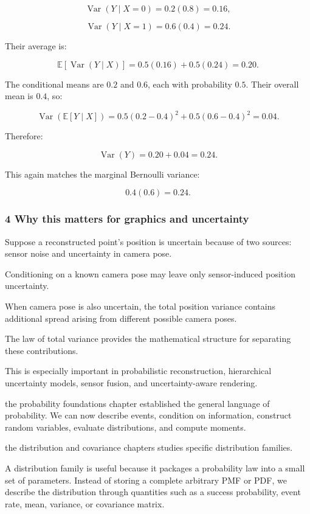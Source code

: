 \[
 \operatorname{Var}(Y\mid X=0)=0.2(0.8)=0.16,
\]

\[
 \operatorname{Var}(Y\mid X=1)=0.6(0.4)=0.24.
\]

Their average is:

\[
 \mathbb E[\operatorname{Var}(Y\mid X)] = 0.5(0.16)+0.5(0.24) =\boxed{0.20}.
\]

The conditional means are \(0.2\) and \(0.6\), each with probability \(0.5\). Their overall mean is \(0.4\), so:

\[
 \operatorname{Var}(\mathbb E[Y\mid X]) = 0.5(0.2-0.4)^2+ 0.5(0.6-0.4)^2 =\boxed{0.04}.
\]

Therefore:

\[
 \operatorname{Var}(Y)=0.20+0.04=\boxed{0.24}.
\]

This again matches the marginal Bernoulli variance:

\[
 0.4(0.6)=0.24.
\]

\subsubsection{4 Why this matters for graphics and uncertainty}\label{02-foundations-ii-ch023-why-this-matters-for-graphics-and-uncertainty}

\hypertarget{02-foundations-ii-ch023-why-this-matters-for-graphics-and-uncertainty}{}

Suppose a reconstructed point's position is uncertain because of two sources: sensor noise and uncertainty in camera pose.

Conditioning on a known camera pose may leave only sensor-induced position uncertainty.

When camera pose is also uncertain, the total position variance contains additional spread arising from different possible camera poses.

The law of total variance provides the mathematical structure for separating these contributions.

This is especially important in probabilistic reconstruction, hierarchical uncertainty models, sensor fusion, and uncertainty-aware rendering.

the probability foundations chapter established the general language of probability. We can now describe events, condition on information, construct random variables, evaluate distributions, and compute moments.

the distribution and covariance chapters studies specific distribution families.

A distribution family is useful because it packages a probability law into a small set of parameters. Instead of storing a complete arbitrary PMF or PDF, we describe the distribution through quantities such as a success probability, event rate, mean, variance, or covariance matrix.


